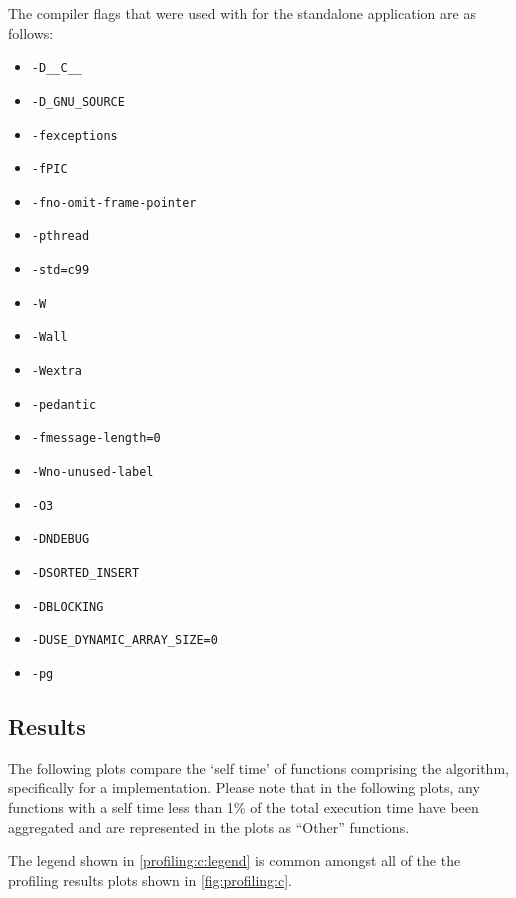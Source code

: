 The compiler flags that were used with  for the standalone
 application are as follows:
\begin{itemize}[noitemsep]
    \item \lstinline|-D__C__|
    \item \lstinline|-D_GNU_SOURCE|
    \item \lstinline|-fexceptions|
    \item \lstinline|-fPIC|
    \item \lstinline|-fno-omit-frame-pointer|
    \item \lstinline|-pthread|
    \item \lstinline|-std=c99|
    \item \lstinline|-W|
    \item \lstinline|-Wall|
    \item \lstinline|-Wextra|
    \item \lstinline|-pedantic|
    \item \lstinline|-fmessage-length=0|
    \item \lstinline|-Wno-unused-label|
    \item \lstinline|-O3|
    \item \lstinline|-DNDEBUG|
    \item \lstinline|-DSORTED_INSERT|
    \item \lstinline|-DBLOCKING|
    \item \lstinline|-DUSE_DYNAMIC_ARRAY_SIZE=0|
    \item \lstinline|-pg|
\end{itemize}

\subsection{Results}
\label{profiling:c:results}
The following plots compare the `self time' of functions comprising the
 algorithm, specifically for a
 implementation. Please note that in the following plots, any
functions with a self time less than 1\% of the total execution time have been
aggregated and are represented in the plots as ``Other'' functions.

The legend shown in \autoref{profiling:c:legend} is common amongst all of the
the  profiling results plots shown in
\autoref{fig:profiling:c}.

